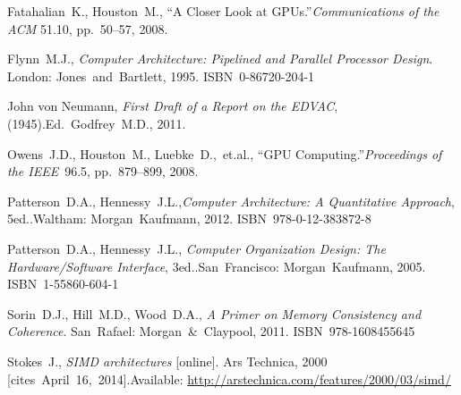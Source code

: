 {\raggedright
	\begin{thebibliography}{99}
		
			Fatahalian~K., Houston~M.,
			``A Closer Look at GPUs.''\linebreak[1]
			\textit{Communications of the ACM} 51.10, pp.~50--57, 2008.
		
			Flynn~M.J.,
			\textit{Computer Architecture: Pipelined and Parallel Processor Design}.
			\linebreak[3]
			London: Jones~and~Bartlett, 1995. ISBN~0-86720-204-1
		
			John von Neumann,
			\textit{First Draft of a Report on the EDVAC}, (1945).\linebreak[2]
			Ed.~Godfrey~M.D., 2011.
		
			Owens~J.D., Houston~M., Luebke~D.,~et.al.,
			``GPU Computing.''\linebreak[1]
			\textit{Proceedings of the IEEE}~96.5, pp.~879--899,
			2008.
		
			Patterson~D.A., Hennessy~J.L.,\linebreak[1]
			\textit{Computer Architecture: A Quantitative Approach},
				5\nth ed..\linebreak[1]
			Waltham: Morgan~Kaufmann, 2012. ISBN~978-0-12-383872-8
		
			Patterson~D.A., Hennessy~J.L., \linebreak[1]
			\textit{Computer Organization Design: %
				The Hardware/Software Interface}, 3\rd ed..\linebreak[1]
			San~Francisco: Morgan~Kaufmann, 2005. ISBN~1-55860-604-1
		
			Sorin~D.J., Hill~M.D., Wood~D.A.,
			\textit{A Primer on Memory Consistency and Coherence}.
			San~Rafael: Morgan~\&~Claypool, 2011. ISBN~978-1608455645
		
			Stokes~J.,
			\textit{SIMD architectures} [online]. Ars Technica, 2000 %
			[cites~April~16,~2014].\linebreak[1]
			Available: \url{http://arstechnica.com/features/2000/03/simd/}
			

\end{thebibliography}}
